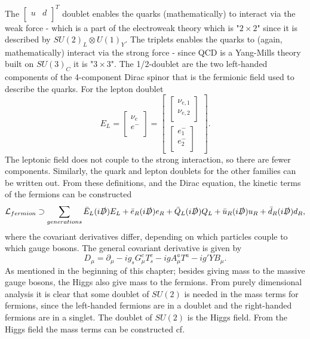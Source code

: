 The $\begin{bmatrix}
u &
d\\
\end{bmatrix}^T$ doublet enables the quarks (mathematically) to interact via the weak force - which is a part of the electroweak theory which is "$2\times 2$" since it is described by $SU(2)_L\otimes U(1)_Y$. The triplets enables the quarks to (again, mathematically) interact via the strong force - since QCD is a Yang-Mills theory built on $SU(3)_C$ it is "$3\times 3$". The 1/2-doublet are the two left-handed components of the 4-component Dirac spinor that is the fermionic field used to describe the quarks. For the lepton doublet
\begin{equation}
	E_L=\begin{bmatrix}
		\nu_e \\
		e^-\\
	\end{bmatrix}=\begin{bmatrix}
	\begin{bmatrix}
		\nu_{e,1}\\
		\nu_{e,2}\\
	\end{bmatrix} \\
	\begin{bmatrix}
		e^-_{1}\\
		e^-_{2}\\
	\end{bmatrix}
\end{bmatrix}.
\end{equation} 
The leptonic field does not couple to the strong interaction, so there are fewer components. Similarly, the quark and lepton doublets for the other families can be written out. From these definitions, and the Dirac equation, the kinetic terms of the fermions can be constructed
\begin{equation}
	\mathcal{L}_{fermion}\supset \sum_{generations}\bar{E}_L(i\slashed D)E_L+\bar{e}_R(i\slashed D)e_R+\bar{Q}_L(i \slashed D)Q_L+\bar{u}_R(i \slashed D)u_R+\bar{d}_R(i \slashed D)d_R,
\end{equation} 
where the covariant derivatives differ, depending on which particles couple to which gauge bosons. The general covariant derivative is given by
\begin{equation}
	D_\mu=\partial_\mu-ig_sG_\mu^cT_s^c-igA_\mu^aT^a-ig'YB_\mu.
\end{equation} 
As mentioned in the beginning of this chapter; besides giving mass to the massive gauge bosons, the Higgs also give mass to the fermions. From purely dimensional analysis it is clear that some doublet of $SU(2)$ is needed in the mass terms for fermions, since the left-handed fermions are in a doublet and the right-handed fermions are in a singlet. The doublet of $SU(2)$ is the Higgs field. From the Higgs field the mass terms can be constructed cf.
